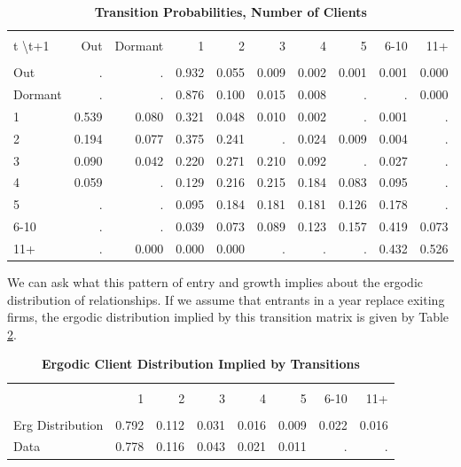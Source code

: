 \begin{table}[bph]
    \centering
    \begin{tabular}{l|rrrrrrrrr} \hline \hline \\
        t \textbackslash t+1 & Out   & Dormant & 1     & 2     & 3     & 4     & 5     & 6-10  & 11+ \\ \hline \\
        Out                  & .     & .       & 0.932 & 0.055 & 0.009 & 0.002 & 0.001 & 0.001 & 0.000  \\
        Dormant              & .     & .       & 0.876 & 0.100 & 0.015 & 0.008 & .     & .     & 0.000  \\
        1                    & 0.539 & 0.080   & 0.321 & 0.048 & 0.010 & 0.002 & .     & 0.001 & .  \\
        2                    & 0.194 & 0.077   & 0.375 & 0.241 & .     & 0.024 & 0.009 & 0.004 & .  \\
        3                    & 0.090 & 0.042   & 0.220 & 0.271 & 0.210 & 0.092 & .     & 0.027 & .  \\
        4                    & 0.059 & .       & 0.129 & 0.216 & 0.215 & 0.184 & 0.083 & 0.095 & .  \\
        5                    & .     & .       & 0.095 & 0.184 & 0.181 & 0.181 & 0.126 & 0.178 & .  \\
        6-10                 & .     & .       & 0.039 & 0.073 & 0.089 & 0.123 & 0.157 & 0.419 & 0.073  \\
        11+                  & .     & 0.000   & 0.000 & 0.000 & .     & .     & .     & 0.432 & 0.526  \\ \hline
    \end{tabular}
    \caption{\textbf{Transition Probabilities, Number of Clients}}
    \label{tab:trans_probs}\centering
\end{table}

We can ask what this pattern of entry and growth implies about the ergodic
distribution of relationships. If we assume that entrants in a year replace
exiting firms, the ergodic distribution implied by this transition matrix is
given by Table \ref{tab:erg_cli_dist}.

\begin{table}[bph]
    \centering
    \begin{tabular}{l|rrrrrrr} \hline \hline \\
                 & 1     & 2         & 3         & 4         & 5         & 6-10      & 11+ \\ \hline \\
Erg Distribution & 0.792 &     0.112 &     0.031 &     0.016 &     0.009 &     0.022 &     0.016 \\
Data             & 0.778 & 0.116     & 0.043     & 0.021     & 0.011     & .         & . \\ \hline
    \end{tabular}
    \caption{\textbf{Ergodic Client Distribution Implied by Transitions}}
    \label{tab:erg_cli_dist}\centering{\small \ }
\end{table}

